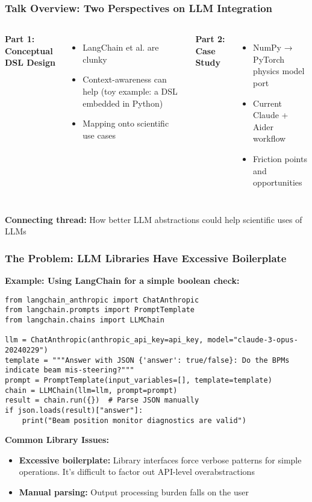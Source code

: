 \documentclass{beamer}
\title{}
\subtitle{}
\author{}
\date{\today}
\begin{document}
\begin{frame}
\titlepage
\end{frame}

\begin{frame}
\frametitle{Talk Overview: Two Perspectives on LLM Integration}

\begin{columns}
\textbf{Part 1: Conceptual DSL Design}
\begin{itemize}
\item LangChain et al. are clunky
\item Context-awareness can help (toy example: a DSL embedded in Python)
\item Mapping onto scientific use cases
\end{itemize}

\textbf{Part 2: Case Study}
\begin{itemize}
\item NumPy → PyTorch physics model port
\item Current Claude + Aider workflow
\item Friction points and opportunities
\end{itemize}
\end{columns}

\vspace{0.5cm}
\centering
\textbf{Connecting thread:} How better LLM abstractions could help scientific uses of LLMs
\end{frame}

\begin{frame}[fragile]
\frametitle{The Problem: LLM Libraries Have Excessive Boilerplate}

\textbf{Example: Using LangChain for a simple boolean check:}
\begin{lstlisting}[basicstyle=\ttfamily\scriptsize]
from langchain_anthropic import ChatAnthropic
from langchain.prompts import PromptTemplate
from langchain.chains import LLMChain

llm = ChatAnthropic(anthropic_api_key=api_key, model="claude-3-opus-20240229")
template = """Answer with JSON {'answer': true/false}: Do the BPMs indicate beam mis-steering?"""
prompt = PromptTemplate(input_variables=[], template=template)
chain = LLMChain(llm=llm, prompt=prompt)
result = chain.run({})  # Parse JSON manually
if json.loads(result)["answer"]:
    print("Beam position monitor diagnostics are valid")
\end{lstlisting}

\textbf{Common Library Issues:}
\begin{itemize}
\item \textbf{Excessive boilerplate:} Library interfaces force verbose patterns for simple operations. It's difficult to factor out API-level overabstractions
\item \textbf{Manual parsing:} Output processing burden falls on the user
\end{itemize}
\end{frame}
\end{document}
